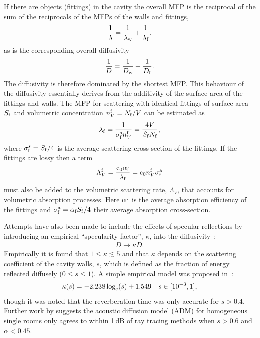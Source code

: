 \documentclass[a4paper]{article}
\numberwithin{equation}{section}
\begin{document}
If there are objects (fittings) in the cavity the overall MFP is the reciprocal of the 
sum of the reciprocals of the MFPs of the walls and fittings,
\begin{align}
\label{eq:harmmean}
\frac{1}{\lambda} = \frac{1}{\lambda_{\mathrm{w}}} + \frac{1}{\lambda_{\mathrm{f}}},
\end{align}
as is the corresponding overall diffusivity~\citep{Valeau2007}
\begin{align}
\frac{1}{D} = \frac{1}{D_{\mathrm{w}}} + \frac{1}{D_{\mathrm{f}}}.
\end{align}
The diffusivity is therefore dominated by the shortest MFP. This behaviour
of the diffusivity essentially derives from the additivity of the surface area
of the fittings and walls. The MFP for scattering with identical fittings of 
surface area $S_{\mathrm{f}}$ and volumetric
concentration $n_V^{\mathrm{f}}=N_{\mathrm{f}}/V$ can be estimated as~\citep{Valeau2007}
\begin{align}
\lambda_{\mathrm{f}} = \frac{1}{\sigma_{\mathrm{f}}^{\mathrm{s}} n_V^{\mathrm{f}}} = \frac{4V}{S_{\mathrm{f}} N_{\mathrm{f}}},
\end{align}
where $\sigma_{\mathrm{f}}^s=S_{\mathrm{f}}/4$ is the average scattering cross-section of the
fittings. If the fittings are lossy then a term
\begin{align}
\Lambda_V^{\mathrm{f}} = \frac{\mathrm{c}_0\alpha_{\mathrm{f}}}{\lambda_{\mathrm{f}}} = \mathrm{c}_0 n_V^{\mathrm{f}} \sigma_{\mathrm{f}}^{\mathrm{a}}
\end{align}
must also be added to the volumetric scattering rate, $\Lambda_V$, that accounts
for volumetric absorption processes. Here $\alpha_{\mathrm{f}}$ is the average
absorption efficiency of the fittings and $\sigma_{\mathrm{f}}^{\mathrm{a}}=\alpha_{\mathrm{f}} S_{\mathrm{f}}/4$ their
average absorption cross-section.

Attempts have also been made to include the effects of specular reflections by
introducing an empirical ``specularity factor'', ${\kappa}$, into the diffusivity~\citep{Foy2009}:
\begin{align}
\label{eq:kappa}
D \rightarrow \kappa D .
\end{align}
Empirically it is found that $1\leq\kappa\lesssim 5$ and that $\kappa$ depends on the 
scattering coefficient of the cavity walls, $s$, which is defined as the fraction
of energy reflected diffusely ($0 \leq s \leq 1$). A simple empirical model was proposed
in~\citep{Foy2009}:
\begin{align}
\kappa(s) = -2.238\log_{\mathrm{e}}(s) + 1.549 \,\,\,\,\,\,s\in [10^{-3},1],
\end{align}
though it was noted that the reverberation time was only accurate for $s>0.4$. Further
work by \cite{Navarro2013} suggests the acoustic diffusion model (ADM) for homogeneous single 
rooms only agrees to within 1\,dB of ray tracing methods when $s>0.6$ and $\alpha<0.45$.
\end{document}
